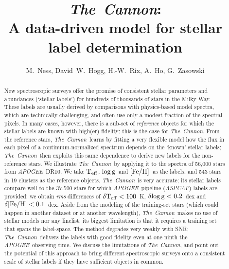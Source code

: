 \documentclass[12pt, preprint]{aastex}
\newcommand{\tc}{\textsl{The~Cannon}}
\newcommand{\apogee}{\textsl{APOGEE}}
\newcommand{\aspcap}{\textsl{ASPCAP}}
\newcommand{\teff}{\mbox{$\rm T_{eff}$}}
\newcommand{\feh}{\mbox{$\rm [Fe/H]$}}
\newcommand{\logg}{\mbox{$\rm \log g$}}
\begin{document}
\title{\tc:\\ A data-driven model for stellar label determination}
\author{M.~Ness,  
David~W.~Hogg, 
H.-W.~Rix, 
A.~Ho, 
G.~Zasowski}

\begin{abstract}%
New spectroscopic surveys offer the promise of consistent stellar
parameters and abundances (`stellar labels') for hundreds of thousands
of stars in the Milky Way. 
These labels are usually derived by comparisons with physics-based
model spectra, which are technically challenging, and often use only a
modest fraction of the spectral pixels. 
In many cases, however, there is a sub-set of \emph{reference}
objects for which the stellar labels are known with high(er)
fidelity; this is the case for \tc.
From the reference stars, \tc\ learns by fitting a very flexible
model how the flux in each pixel of a continuum-normalized spectrum
depends on the `known' stellar labels; \tc\ then exploits this same
dependence to derive new labels for the non-reference stars.
We illustrate \tc\ by applying it to the spectra of 56,000 stars from
\apogee\ DR10. 
We take \teff, \logg\ and \feh\ as the labels, and 543 stars in 19
clusters as the reference objects. 
\tc\ is very accurate; its stellar labels compare well to the 37,500
stars for which \apogee\ pipeline (\aspcap) labels are provided; we
obtain \textit{rms} differences of $\delta\teff< 100$~K, $\delta\logg< 0.2$~dex
and $\delta\feh< 0.1$~dex.
Aside from the modeling of the training-set stars (which could happen
in another dataset or at another wavelength), \tc\ makes no use of
stellar models nor any linelist; its biggest limitation is that it
requires a training set that spans the label-space. 
The method degrades very weakly with SNR; \tc\ delivers
the labels with good fidelity even at one ninth the
\apogee\ observing time. 
We discuss the limitations of \tc, and point out the potential of this
approach to bring different spectroscopic surveys onto a consistent
scale of stellar labels if they have sufficient objects in common.
\end{abstract}
\end{document}
